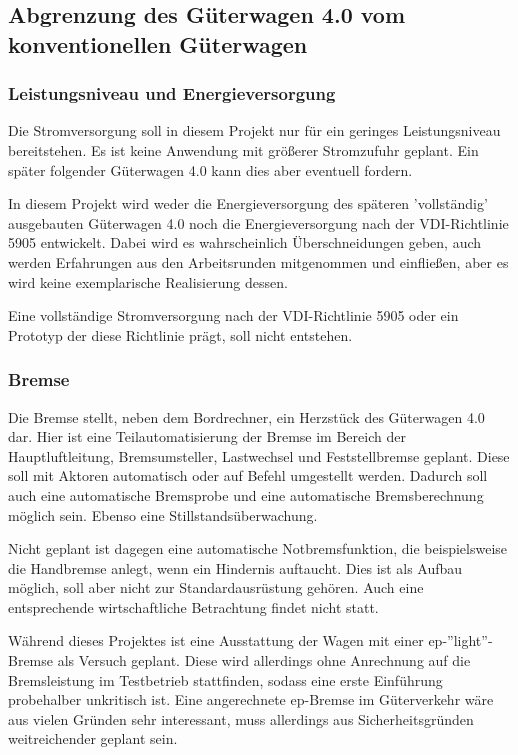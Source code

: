 \subsection{Abgrenzung des Güterwagen 4.0 vom konventionellen Güterwagen}
\subsubsection{Leistungsniveau und Energieversorgung}
Die Stromversorgung soll in diesem Projekt nur für ein geringes Leistungsniveau bereitstehen. Es ist keine Anwendung mit größerer Stromzufuhr geplant. Ein später folgender Güterwagen 4.0  kann dies aber eventuell fordern.\par
In diesem Projekt wird weder die Energieversorgung des späteren 'vollständig' ausgebauten Güterwagen 4.0 noch die Energieversorgung nach der VDI-Richtlinie 5905 entwickelt. Dabei wird es wahrscheinlich Überschneidungen geben, auch werden Erfahrungen aus den Arbeitsrunden mitgenommen und einfließen, aber es wird keine exemplarische Realisierung dessen.\par
Eine vollständige Stromversorgung nach der VDI-Richtlinie 5905 oder ein Prototyp der diese Richtlinie prägt, soll nicht entstehen. 

\subsubsection{Bremse}
Die Bremse stellt, neben dem Bordrechner, ein Herzstück des Güterwagen 4.0  dar.
Hier ist eine Teilautomatisierung der Bremse im Bereich der Hauptluftleitung, Bremsumsteller, Lastwechsel und Feststellbremse geplant. Diese soll mit Aktoren automatisch oder auf Befehl umgestellt werden. Dadurch soll auch eine automatische Bremsprobe und eine automatische Bremsberechnung möglich sein. Ebenso eine Stillstandsüberwachung.\par
Nicht geplant ist dagegen eine automatische Notbremsfunktion, die beispielsweise die Handbremse anlegt, wenn ein Hindernis auftaucht. Dies ist als Aufbau möglich, soll aber nicht zur Standardausrüstung gehören. Auch eine entsprechende wirtschaftliche Betrachtung findet nicht statt.\par
Während dieses Projektes ist eine Ausstattung der Wagen mit einer ep-''light''-Bremse als Versuch geplant. Diese wird allerdings ohne Anrechnung auf die Bremsleistung im Testbetrieb stattfinden, sodass eine erste Einführung probehalber unkritisch ist. Eine angerechnete ep-Bremse im Güterverkehr wäre aus vielen Gründen sehr interessant, muss allerdings aus Sicherheitsgründen weitreichender geplant sein.\par


